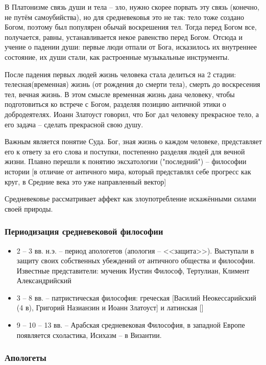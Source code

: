 \documentclass[a4paper, 12pt]{book} %
\begin{document}
В Платонизме связь души и тела -- зло, нужно скорее порвать эту связь (конечно, не путём самоубийства), но для средневековья это не так: тело тоже создано Богом, поэтому был популярен обычай воскрешения тел. Тогда перед Богом все, получается, равны, устанавливается некое равенство перед Богом. Отсюда и учение о падении души: первые люди отпали от Бога, исказилось их внутреннее состояние, их души стали, как растроенные музыкальные инструменты. 

После падения первых людей жизнь человека стала делиться на 2 стадии: телесная(временная) жизнь (от рождения до смерти тела), смерть до воскресения тел, вечная жизнь. В этом смысле временная жизнь дана человеку, чтобы подготовиться ко встрече с Богом,  разделяя позицию античной этики о добродеятелях. Иоанн Златоуст говорил, что Бог дал человеку прекрасное тело, а его задача -- сделать прекрасной свою душу.

Важным является понятие Суда. Бог, зная жизнь о каждом человеке, представляет его к ответу за его слова и поступки, постепенно разделяя людей для вечной жизни. Плавно перешли к понятию эксхатологии ("последний") -- философии истории [в отличие от античного мира, который представлял себе прогресс как круг, в Средние века это уже направленный вектор]

Средневековье рассматривает аффект как злоупотребление искажёнными силами своей природы.

\subsubsection{Периодизация средневековой философии}

\begin{itemize}
\item 2 -- 3 вв. н.э. -- период апологетов (апология -- <<защита>>). Выступали в защиту своих собственных убеждений от античного общества и философии. Известные представители: мученик Иустин Философ, Тертулиан, Климент Александрийский
\item 3 -- 8 вв. -- патристическая философия: греческая [Василий Неокессарийский (4 в), Григорий Назианзин и Иоанн Златоуст] и латинская []
\item 9 -- 10 -- 13 вв. -- Арабская средневековая Философия, в западной Европе появляется схоластика, Исихазм -- в Византии.
\end{itemize}

\subsubsection{Апологеты}
\end{document}

